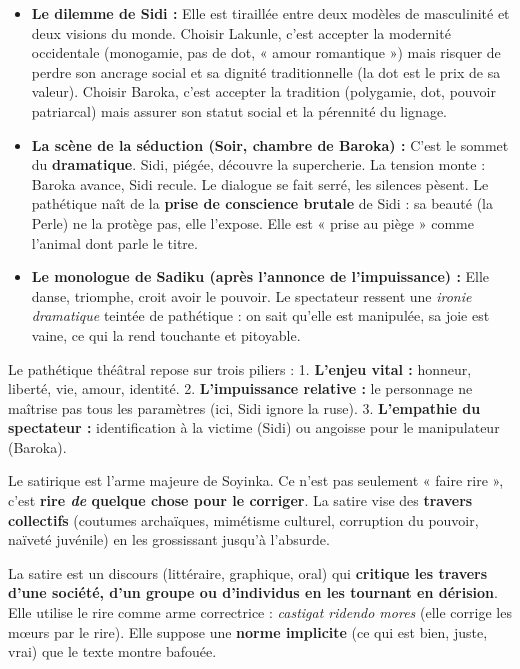 \documentclass[11pt]{article}
\newcommand{\cle}[1]{{\popxbold\color{popdark}#1}}
\newcounter{popsec}
\newcounter{popsub}
\newcommand{\courssub}[1]{%
  \stepcounter{popsub}%
  \par\vspace{9pt}\noindent{\popxbold\fontsize{11.5}{13}\selectfont\color{popink}{\color{poporange}\thepopsec.\thepopsub}\hspace{6pt}#1}\par\nopagebreak\vspace{4pt}
}
\begin{document}
\begin{itemize}
    \item \textbf{Le dilemme de Sidi :} Elle est tiraillée entre deux modèles de masculinité et deux visions du monde. Choisir Lakunle, c'est accepter la modernité occidentale (monogamie, pas de dot, « amour romantique ») mais risquer de perdre son ancrage social et sa dignité traditionnelle (la dot est le prix de sa valeur). Choisir Baroka, c'est accepter la tradition (polygamie, dot, pouvoir patriarcal) mais assurer son statut social et la pérennité du lignage.
    \item \textbf{La scène de la séduction (Soir, chambre de Baroka) :} C'est le sommet du \textbf{dramatique}. Sidi, piégée, découvre la supercherie. La tension monte : Baroka avance, Sidi recule. Le dialogue se fait serré, les silences pèsent. Le pathétique naît de la \textbf{prise de conscience brutale} de Sidi : sa beauté (la Perle) ne la protège pas, elle l'expose. Elle est « prise au piège » comme l'animal dont parle le titre.
    \item \textbf{Le monologue de Sadiku (après l'annonce de l'impuissance) :} Elle danse, triomphe, croit avoir le pouvoir. Le spectateur ressent une \emph{ironie dramatique} teintée de pathétique : on sait qu'elle est manipulée, sa joie est vaine, ce qui la rend touchante et pitoyable.
\end{itemize}

\begin{propriete}
Le pathétique théâtral repose sur trois piliers :
1. \textbf{L'enjeu vital :} honneur, liberté, vie, amour, identité.
2. \textbf{L'impuissance relative :} le personnage ne maîtrise pas tous les paramètres (ici, Sidi ignore la ruse).
3. \textbf{L'empathie du spectateur :} identification à la victime (Sidi) ou angoisse pour le manipulateur (Baroka).
\end{propriete}

\courssub{Le satirique : la critique par le rire}

Le \cle{satirique} est l'arme majeure de Soyinka. Ce n'est pas seulement « faire rire », c'est \textbf{rire \emph{de} quelque chose pour le corriger}. La satire vise des \textbf{travers collectifs} (coutumes archaïques, mimétisme culturel, corruption du pouvoir, naïveté juvénile) en les grossissant jusqu'à l'absurde.

\begin{definition}[La satire]
La satire est un discours (littéraire, graphique, oral) qui \textbf{critique les travers d'une société, d'un groupe ou d'individus en les tournant en dérision}. Elle utilise le rire comme arme correctrice : \emph{castigat ridendo mores} (elle corrige les mœurs par le rire). Elle suppose une \textbf{norme implicite} (ce qui est bien, juste, vrai) que le texte montre bafouée.
\end{definition}
\end{document}

